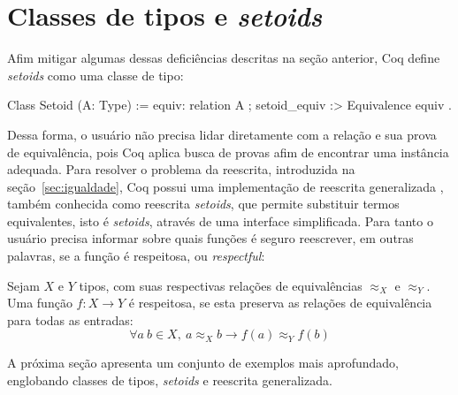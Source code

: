 \section{Classes de tipos e \textit{setoids}}\label{sec:classes-setoids}
Afim mitigar algumas dessas deficiências descritas na seção anterior, Coq define \textit{setoids} como uma classe de tipo:
\begin{coqcode}
Class Setoid (A: Type) := {
   equiv: relation A ;
   setoid_equiv :> Equivalence equiv 
}.
\end{coqcode}
Dessa forma, o usuário não precisa lidar diretamente com a relação e sua prova de equivalência, pois Coq aplica busca de provas afim de encontrar uma instância  adequada. Para resolver o problema da reescrita, introduzida na seção~\ref{sec:igualdade}, Coq possui uma implementação de reescrita generalizada \cite{Sozeau2009}, também conhecida como reescrita \textit{setoids}, que permite substituir termos equivalentes, isto é \textit{setoids}, através de uma interface simplificada. Para tanto o usuário precisa informar sobre quais funções é seguro reescrever, em outras palavras, se a função é respeitosa, ou \textit{respectful}:
\begin{definicao}\label{def:respeitosa}
	Sejam $X$ e $Y$ tipos, com suas respectivas relações de equivalências $\approx_X$ e $\approx_Y$. Uma função $f: X \rightarrow Y$ é respeitosa, se esta preserva as relações de equivalência para todas as entradas:
	\begin{equation*}
		\forall a~b \in X,~a \approx_X b \rightarrow f(a) \approx_Y f(b)
	\end{equation*}
\end{definicao}\noindent
A próxima seção apresenta um conjunto de exemplos mais aprofundado, englobando classes de tipos, \textit{setoids} e reescrita generalizada.


